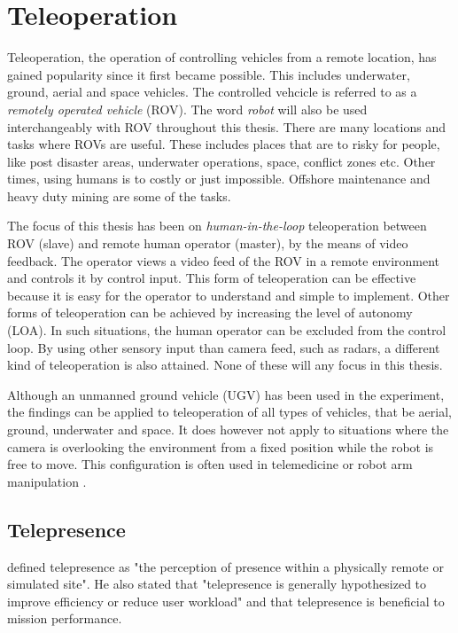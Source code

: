 \section{Teleoperation}

Teleoperation, the operation of controlling vehicles from a remote location, has gained popularity since it first became possible. This includes underwater, ground, aerial and space vehicles. The controlled vehcicle is referred to as a \emph{remotely operated vehicle} (ROV). The word \emph{robot} will also be used interchangeably with ROV throughout this thesis. There are many locations and tasks where ROVs are useful. These includes places that are to risky for people, like post disaster areas, underwater operations, space, conflict zones etc. Other times, using humans is to costly or just impossible. Offshore maintenance and heavy duty mining are some of the tasks. 

The focus of this thesis has been on \emph{human-in-the-loop} teleoperation between ROV (slave) and remote human operator (master), by the means of video feedback. The operator views a video feed of the ROV in a remote environment and controls it by control input. This form of teleoperation can be effective because it is easy for the operator to understand and simple to implement. Other forms of teleoperation can be achieved by increasing the level of autonomy (LOA). In such situations, the human operator can be excluded from the control loop. By using other sensory input than camera feed, such as radars, a different kind of teleoperation is also attained. None of these will any focus in this thesis.

\clearpage
Although an unmanned ground vehicle (UGV) has been used in the experiment, the findings can be applied to teleoperation of all types of vehicles, that be aerial, ground, underwater and space. It does however not apply to situations where the camera is overlooking the environment from a fixed position while the robot is free to move. This configuration is often used in telemedicine \citep{Kumcu2017} or robot arm manipulation \citep{Bejczy1990}.

\vspace{-3mm}
\subsection{Telepresence}
\vspace{-3mm}

\citet{Draper1998} defined telepresence as "the perception of presence within a physically remote or simulated site". He also stated that "telepresence is generally hypothesized to improve efficiency or reduce user workload" and that telepresence is beneficial to mission performance.

